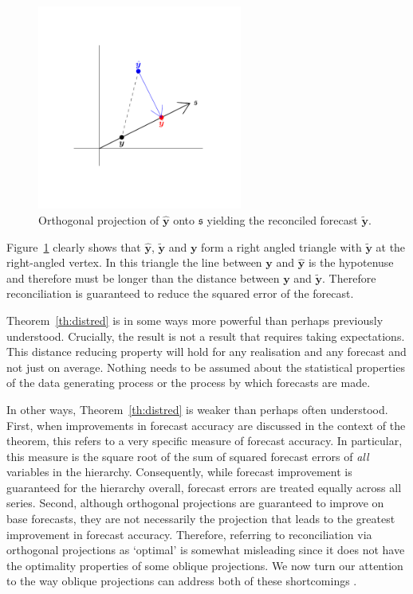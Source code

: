 \documentclass[12pt]{article}
\theoremstyle{definition}
\begin{document}
\begin{figure}[!hbt]
  \centering \includegraphics[width=0.6\textwidth]{Figs/orth_pointforerec_schematic.pdf}
  \caption{Orthogonal projection of $\hat{\bm{y}}$ onto $\mathfrak{s}$ yielding the reconciled forecast $\tilde{\bm{y}}$.}\label{fig:Schematic_OLSRecon}
\end{figure}

Figure~\ref{fig:Schematic_OLSRecon} clearly shows that $\hat{\bm{y}}$, $\tilde{\bm{y}}$ and $\bm{y}$ form a right angled triangle with $\tilde{\bm{y}}$ at the right-angled vertex. In this triangle the line between $\bm{y}$ and $\hat{\bm{y}}$ is the hypotenuse and therefore must be longer than the distance between $\bm{y}$ and $\tilde{\bm{y}}$. Therefore reconciliation is guaranteed to reduce the squared error of the forecast.

Theorem~\ref{th:distred} is in some ways more powerful than perhaps previously understood. Crucially, the result is not a result that requires taking expectations. This distance reducing property will hold for any realisation and any forecast and not just on average. Nothing needs to be assumed about the statistical properties of the data generating process or the process by which forecasts are made.

In other ways, Theorem~\ref{th:distred} is weaker than perhaps often understood. First, when improvements in forecast accuracy are discussed in the context of the theorem, this refers to a very specific measure of forecast accuracy. In particular, this measure is the square root of the sum of squared forecast errors of \emph{all} variables in the hierarchy. Consequently, while forecast improvement is guaranteed for the hierarchy overall, {\color{blue} forecast errors are treated equally across all series}. Second, although orthogonal projections are guaranteed to improve on base forecasts, they are not necessarily the projection that leads to the greatest improvement in forecast accuracy. Therefore, referring to reconciliation via orthogonal projections as `optimal' is somewhat misleading since it does not have the optimality properties of some oblique projections. {\color{blue} We now turn our attention to the way oblique projections can address both of these shortcomings} .
\end{document}
